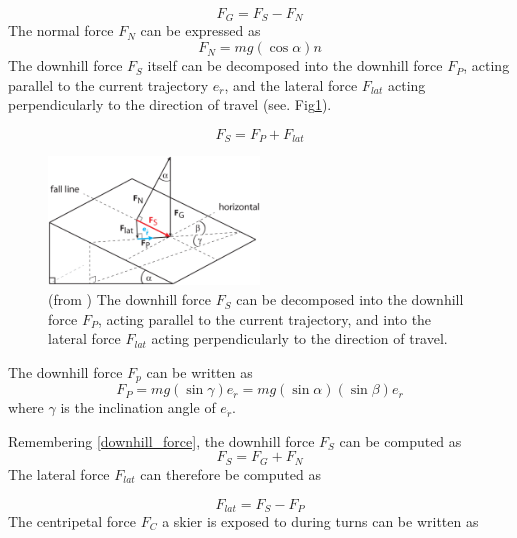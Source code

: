 \documentclass[12pt,a4paper,twoside]{book}
\begin{document}
\begin{equation}\label{downhill_force}
F_G=F_S-F_N
\end{equation}
The normal force $F_N$ can be expressed as
\begin{equation}
F_N=mg(\cos \alpha )n
\end{equation}
The downhill force $F_S$ itself can be decomposed into the downhill force $F_P$, acting parallel to the current trajectory $e_{\dot{r}}$, and the lateral force $F_{lat}$ acting perpendicularly to the direction of travel (see. Fig\ref{downhill_force_pic}).

\begin{equation}
F_S=F_P+F_{lat}
\end{equation}
\begin{figure}[!ht]
  \begin{center}
    \includegraphics[width=0.5\textwidth]{images/figure5.eps}
    \caption{(from \cite{hol2012}) The downhill force $F_S$ can be decomposed into the downhill force $F_P$, acting parallel to the current trajectory, and into the lateral force $F_{lat}$ acting perpendicularly to the direction of travel.}\label{downhill_force_pic}
  \end{center}
\end{figure}

The downhill force $F_p$ can be written as
\begin{equation}
F_P=mg ( \sin \gamma ) e_{\dot{r}}=mg ( \sin \alpha ) ( \sin \beta ) e_{\dot{r}}
\end{equation}
where $\gamma$ is the inclination angle of $e_{\dot{r}}$.

Remembering \ref{downhill_force}, the downhill force $F_S$ can be computed as
\begin{equation}
F_S=F_G+F_N
\end{equation}
The lateral force $F_{lat}$ can therefore be computed as

\begin{equation}
F_{lat}=F_S-F_P
\end{equation}
The centripetal force $F_C$ a skier is exposed to during turns can be written as
\end{document}
